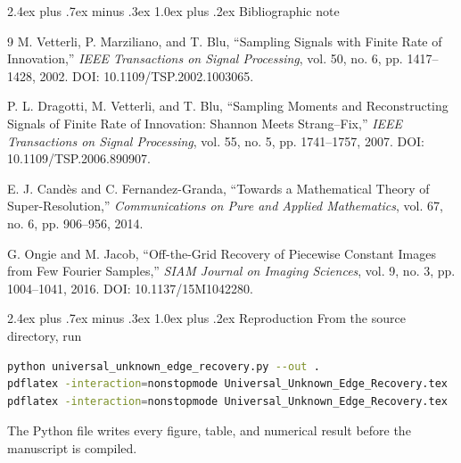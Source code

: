 \documentclass[11pt,oneside]{book}
\makeatletter
\renewcommand\chapter{\@startsection{chapter}{0}{\z@}%
  {2.4ex plus .7ex minus .3ex}%
  {1.0ex plus .2ex}%
  {\normalfont\LARGE\bfseries\color{Ink}}}
\theoremstyle{remark}
\makeatother
\begin{document}


\chapter{Bibliographic note}
\begin{thebibliography}{9}
M. Vetterli, P. Marziliano, and T. Blu,
``Sampling Signals with Finite Rate of Innovation,''
\emph{IEEE Transactions on Signal Processing}, vol. 50, no. 6, pp. 1417--1428, 2002.
DOI: 10.1109/TSP.2002.1003065.

P. L. Dragotti, M. Vetterli, and T. Blu,
``Sampling Moments and Reconstructing Signals of Finite Rate of Innovation: Shannon Meets Strang--Fix,''
\emph{IEEE Transactions on Signal Processing}, vol. 55, no. 5, pp. 1741--1757, 2007.
DOI: 10.1109/TSP.2006.890907.

E. J. Cand\`es and C. Fernandez-Granda,
``Towards a Mathematical Theory of Super-Resolution,''
\emph{Communications on Pure and Applied Mathematics}, vol. 67, no. 6, pp. 906--956, 2014.

G. Ongie and M. Jacob,
``Off-the-Grid Recovery of Piecewise Constant Images from Few Fourier Samples,''
\emph{SIAM Journal on Imaging Sciences}, vol. 9, no. 3, pp. 1004--1041, 2016.
DOI: 10.1137/15M1042280.
\end{thebibliography}

\chapter{Reproduction}
From the source directory, run
\begin{lstlisting}[language=bash,numbers=none]
python universal_unknown_edge_recovery.py --out .
pdflatex -interaction=nonstopmode Universal_Unknown_Edge_Recovery.tex
pdflatex -interaction=nonstopmode Universal_Unknown_Edge_Recovery.tex
\end{lstlisting}
The Python file writes every figure, table, and numerical result before the manuscript is compiled.
\end{document}
